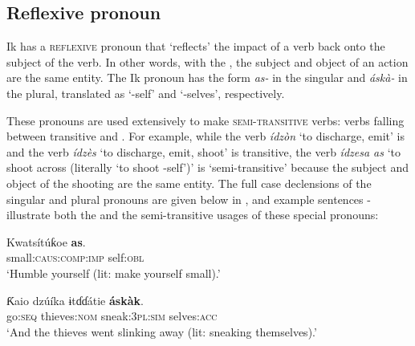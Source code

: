 \subsection{Reflexive pronoun}\label{sec:5.8}


Ik has a \textsc{reflexive} pronoun that ‘reflects’ the impact of a verb back onto the subject of the verb. In other words, with the , the subject and object of an action are the same entity. The Ik  pronoun has the form \textit{as{\Í}-} in the singular and \textit{ás{\Í}kà-} in the plural, translated as ‘-self’ and ‘-selves’, respectively.


These  pronouns are used extensively to make \textsc{semi-transitive} verbs: verbs falling between transitive and . For example, while the verb \textit{ídzòn} ‘to discharge, emit’ is  and the verb \textit{ídzès} ‘to discharge, emit, shoot’ is transitive, the verb \textit{ídzesa as{\Í}} ‘to shoot across (literally `to shoot -self’)’ is ‘semi-transitive’ because the subject and object of the shooting are the same entity. The full case declensions of the singular and plural  pronouns are given below in , and example sentences - illustrate both the  and the semi-transitive usages of these special pronouns:




\ea\label{ex:pro:5}
\gll Kwatsítúƙoe     \textbf{as}. \\
small:\textsc{caus:comp:imp}   self:\textsc{obl}    \\
\glt ‘Humble yourself (lit: make yourself small).’ 
\z




\ea\label{ex:pro:6}
\gll Ƙaio     dzúíka   ɨt{\Í}ɗ{\Í}ɗátie     \textbf{ás{\Í}kàk\ᵃ}. \\
go:\textsc{seq}   thieves:\textsc{nom}   sneak:\textsc{3pl:sim} selves:\textsc{acc}    \\
\glt ‘And the thieves went slinking away (lit: sneaking themselves).’ 
\z



